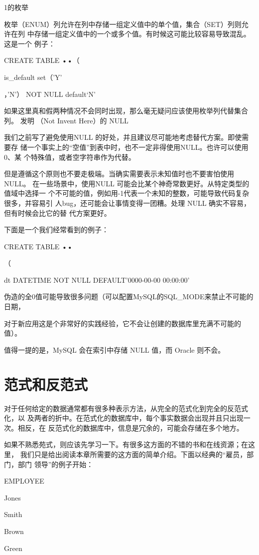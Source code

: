 1的枚举

枚举（ENUM）列允许在列中存储一组定义值中的单个值，集合（SET）列则允许在列
中存储一组定义值中的一个或多个值。有时候这可能比较容易导致混乱。这是一个
例子：

CREATE TABLE ••（

is\_default set（'Y'

，'N'） NOT NULL default‘N'

如果这里真和假两种情况不会同时出现，那么毫无疑问应该使用枚举列代替集合列。
发明 （Not Invent Here）的 NULL

我们之前写了避免使用NULL 的好处，并且建议尽可能地考虑替代方案。即使需要存
储一个事实上的“空值”到表中时，也不一定非得使用NULL。也许可以使用0、某
个特殊值，或者空字符串作为代替。

但是遵循这个原则也不要走极端。当确实需要表示未知值时也不要害怕使用NULL。
在一些场景中，使用NULL 可能会比某个神奇常数更好。从特定类型的值域中选择一
个不可能的值，例如用-1代表一个未知的整数，可能导致代码复杂很多，并容易引
人bug，还可能会让事情变得一团糟。处理 NULL 确实不容易，但有时候会比它的替
代方案更好。

下面是一个我们经常看到的例子：

CREATE TABLE ••

（

dt DATETIME NOT NULL DEFAULT'0000-00-00 00:00:00'

伪造的全0值可能导致很多问题（可以配置MySQL的SQL\_MODE来禁止不可能的日期，

对于新应用这是个非常好的实践经验，它不会让创建的数据库里充满不可能的值）。

值得一提的是，MySQL 会在索引中存储 NULL 值，而 Oracle 则不会。

\section{范式和反范式}
对于任何给定的数据通常都有很多种表示方法，从完全的范式化到完全的反范式化，以
及两者的折中。在范式化的数据库中，每个事实数据会出现并且只出现一次。相反，在
反范式化的数据库中，信息是冗余的，可能会存储在多个地方。

如果不熟悉苑式，则应该先学习一下。有很多这方面的不错的书和在线资源；在这里，
我们只是给出阅读本章所需要的这方面的简单介绍。下面以经典的“雇员，部门，部门
领导”的例子开始：

EMPLOYEE

Jones

Smith

Brown

Green

